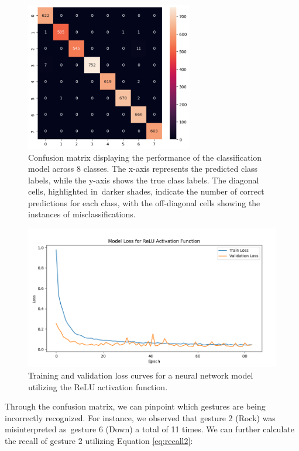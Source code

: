\begin{figure}[ht!]
	\centering
	\includegraphics[width = 0.65\textwidth]{images/confusion_matrix.pdf}
	\caption{Confusion matrix displaying the performance of the classification model across 8 classes. The x-axis represents the predicted class labels, while the y-axis shows the true class labels. The diagonal cells, highlighted in~darker shades, indicate the number of correct predictions for each class, with the off-diagonal cells showing the instances of misclassifications.}
	\label{fig:confusion_matrix}
\end{figure}


\begin{figure}[H]
	\centering
	\includegraphics[width=\textwidth]{images/model_loss_relu.png}
	\caption{Training and validation loss curves for a neural network model utilizing the ReLU activation function.}
	\label{fig:model_loss_relu}
\end{figure}

Through the confusion matrix, we can pinpoint which gestures are being incorrectly recognized. For instance, we observed that gesture 2 (Rock)
was misinterpreted as~gesture 6 (Down)
a total of 11 times. We can further calculate the recall of gesture 2 utilizing Equation \ref{eq:recall2}:

